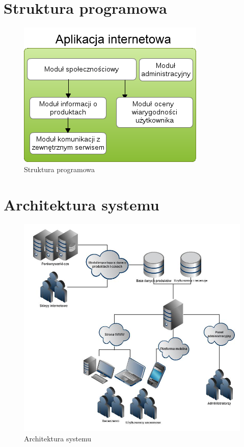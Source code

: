 \section{Struktura programowa}
\begin{figure}[H]
	\centering
	\includegraphics[scale=0.9]{images/modules.png}
	\caption{Struktura programowa}
\end{figure}
\section{Architektura systemu}
\begin{figure}[H]
	\centering
	\includegraphics[scale=0.5]{images/architektura.jpg}
	\caption{Architektura systemu}
\end{figure}
\newpage
